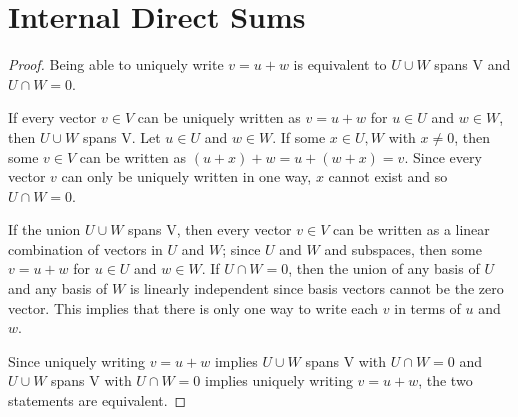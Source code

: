 \section{Internal Direct Sums}

\begin{proof} Being able to uniquely write $v = u + w$ 
    is equivalent to $U \cup W$ spans V and $U \cap W = 0$.\gap

    If every vector $v \in V$ can be uniquely written as
    $v = u + w$ for $u \in U$ and $w \in W$,
    then $U \cup W$ spans V.
    Let $u \in U$ and $w \in W$.
    If some $x \in U,W$ with $x \neq 0$,
    then some $v \in V$ can be written as
    $(u+x) + w = u + (w+x) = v$.
    Since every vector $v$ can only be uniquely written in one way,
    $x$ cannot exist and so $U \cap W = 0$.\gap

    If the union $U \cup W$ spans V, 
    then every vector $v \in V$ can be written as
    a linear combination of vectors in $U$ and $W$; 
    since $U$ and $W$ and subspaces,
    then some $v = u + w$ for $u \in U$ and $w \in W$.
    If $U \cap W = 0$, then the union
    of any basis of $U$ and any basis of $W$
    is linearly independent since
    basis vectors cannot be the zero vector.
    This implies that there is only one way to 
    write each $v$ in terms of $u$ and $w$.\gap

    Since uniquely writing $v = u+w$ implies $U \cup W$ spans V with $U \cap W = 0$
    and $U \cup W$ spans V with $U \cap W = 0$ implies uniquely writing $v = u+w$,
    the two statements are equivalent.
\end{proof}